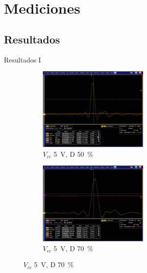 \documentclass{beamer}
\begin{document}
\section{Mediciones}

\subsection{Resultados}

\begin{frame}{Resultados I}
    \begin{figure}[t!]
        \centering
        \begin{subfigure}[b]{0.49\textwidth}
            \centering
            \includegraphics[width=0.6\textwidth]{images/mediciones/vcc_5v_duty_50.png}
            \caption{$V_{cc}$ \qty{5}{\volt}, D \qty{50}{\percent} }
            \label{fig:mediciones_5v_50}
        \end{subfigure}
        \hfill
        \begin{subfigure}[b]{0.49\textwidth}
            \centering
            \includegraphics[width=0.6\textwidth]{images/mediciones/vcc_5v_duty_70.png}
            \caption{$V_{cc}$ \qty{5}{\volt}, D \qty{70}{\percent} }
            \label{fig:mediciones_5v_70}
        \end{subfigure}
        \label{fig:mediciones_5v}
    \end{figure}


\end{frame}
\end{document}
